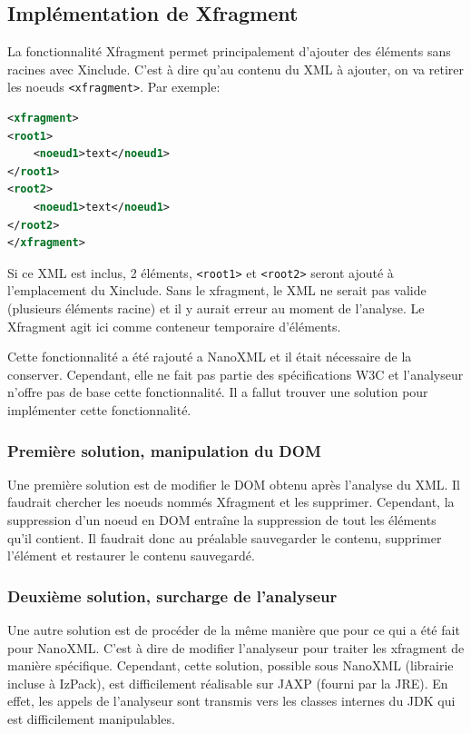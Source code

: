\subsection{Implémentation de Xfragment}
La fonctionnalité Xfragment permet principalement d'ajouter des éléments sans racines avec Xinclude.
C'est à dire qu'au contenu du XML à ajouter, on va retirer les noeuds \verb|<xfragment>|.
Par exemple:
\begin{lstlisting}[language=XML]
<xfragment>
<root1>
	<noeud1>text</noeud1>
</root1>
<root2>
	<noeud1>text</noeud1>
</root2>
</xfragment>
\end{lstlisting}
Si ce XML est inclus, 2 éléments, \verb|<root1>| et \verb|<root2>| seront ajouté à l'emplacement du Xinclude.
Sans le xfragment, le XML ne serait pas valide (plusieurs éléments racine) et il y aurait erreur au moment de l'analyse.
Le Xfragment agit ici comme conteneur temporaire d'éléments.

Cette fonctionnalité a été rajouté a NanoXML et il était nécessaire de la conserver.
Cependant, elle ne fait pas partie des spécifications W3C et l'analyseur n'offre pas de base cette fonctionnalité.
Il a fallut trouver une solution pour implémenter cette fonctionnalité.

\subsubsection{Première solution, manipulation du DOM}
Une première solution est de modifier le DOM obtenu après l'analyse du XML. 
Il faudrait chercher les noeuds nommés Xfragment et les supprimer.
Cependant, la suppression d'un noeud en DOM entraîne la suppression de tout les éléments qu'il contient.
Il faudrait donc au préalable sauvegarder le contenu, supprimer l'élément et restaurer le contenu sauvegardé.

\subsubsection{Deuxième solution, surcharge de l'analyseur}
Une autre solution est de procéder de la même manière que pour ce qui a été fait pour NanoXML.
C'est à dire de modifier l'analyseur pour traiter les xfragment de manière spécifique.
Cependant, cette solution, possible sous NanoXML (librairie incluse à IzPack), est difficilement réalisable sur JAXP (fourni par la JRE).
En effet, les appels de l'analyseur sont transmis vers les classes internes du JDK qui est difficilement manipulables.
